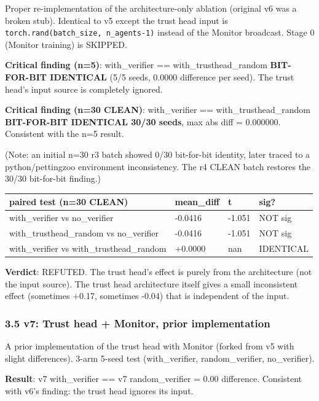 \documentclass[
]{article}
\newcounter{none} %
\begin{document}
Proper re-implementation of the architecture-only ablation (original v6
was a broken stub). Identical to v5 except the trust head input is
\texttt{torch.rand(batch\_size,\ n\_agents-1)} instead of the Monitor
broadcast. Stage 0 (Monitor training) is SKIPPED.

\textbf{Critical finding (n=5)}: with\_verifier ==
with\_trusthead\_random \textbf{BIT-FOR-BIT IDENTICAL} (5/5 seeds,
0.0000 difference per seed). The trust head's input source is completely
ignored.

\textbf{Critical finding (n=30 CLEAN)}: with\_verifier ==
with\_trusthead\_random \textbf{BIT-FOR-BIT IDENTICAL 30/30 seeds}, max
abs diff = 0.000000. Consistent with the n=5 result.

(Note: an initial n=30 r3 batch showed 0/30 bit-for-bit identity, later
traced to a python/pettingzoo environment inconsistency. The r4 CLEAN
batch restores the 30/30 bit-for-bit finding.)

{\def\LTcaptype{none} %
\begin{longtable}[]{@{}llll@{}}
\toprule\noalign{}
paired test (n=30 CLEAN) & mean\_diff & t & sig? \\
\midrule\noalign{}
\endhead
\bottomrule\noalign{}
\endlastfoot
with\_verifier vs no\_verifier & -0.0416 & -1.051 & NOT sig \\
with\_trusthead\_random vs no\_verifier & -0.0416 & -1.051 & NOT sig \\
with\_verifier vs with\_trusthead\_random & +0.0000 & nan & IDENTICAL \\
\end{longtable}
}

\textbf{Verdict}: REFUTED. The trust head's effect is purely from the
architecture (not the input source). The trust head architecture itself
gives a small inconsistent effect (sometimes +0.17, sometimes -0.04)
that is independent of the input.

\subsubsection{3.5 v7: Trust head + Monitor, prior
implementation}\label{v7-trust-head-monitor-prior-implementation}

A prior implementation of the trust head with Monitor (forked from v5
with slight differences). 3-arm 5-seed test (with\_verifier,
random\_verifier, no\_verifier).

\textbf{Result}: v7 with\_verifier == v7 random\_verifier = 0.00
difference. Consistent with v6's finding: the trust head ignores its
input.
\end{document}

